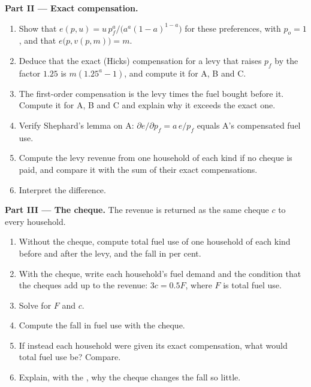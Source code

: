 \begin{problem}
\medskip\noindent\textbf{Part II --- Exact compensation.}
\begin{enumerate}[resume]
  \item Show that $e(p, u) = u\,p_f^{a}/\bigl(a^a(1 - a)^{1-a}\bigr)$ for these preferences, with $p_o = 1$, and that $e\bigl(p, v(p, m)\bigr) = m$.
  \item Deduce that the exact (Hicks) compensation for a levy that raises $p_f$ by the factor $1.25$ is $m(1.25^{a} - 1)$, and compute it for A, B and C.
  \item The first-order compensation is the levy times the fuel bought before it. Compute it for A, B and C and explain why it exceeds the exact one.
  \item Verify Shephard's lemma on A: $\partial e/\partial p_f = a\,e/p_f$ equals A's compensated fuel use.
  \item Compute the levy revenue from one household of each kind if no cheque is paid, and compare it with the sum of their exact compensations.
  \item Interpret the difference.
\end{enumerate}

\medskip\noindent\textbf{Part III --- The cheque.} The revenue is returned as
the same cheque $c$ to every household.
\begin{enumerate}[resume]
  \item Without the cheque, compute total fuel use of one household of each kind before and after the levy, and the fall in per cent.
  \item With the cheque, write each household's fuel demand and the condition that the cheques add up to the revenue: $3c = 0.5F$, where $F$ is total fuel use.
  \item Solve for $F$ and $c$.
  \item Compute the fall in fuel use with the cheque.
  \item If instead each household were given its exact compensation, what would total fuel use be? Compare.
  \item Explain, with the , why the cheque changes the fall so little.
\end{enumerate}


\end{problem}
